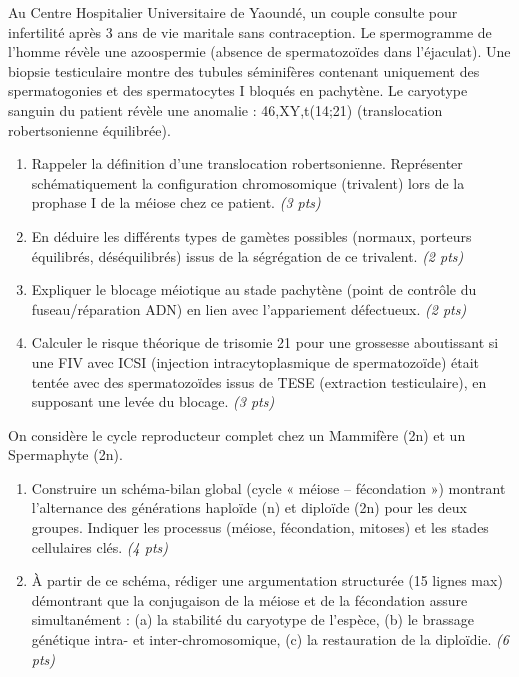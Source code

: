 \documentclass[11pt]{article}
\begin{document}
\begin{exercice}
Au Centre Hospitalier Universitaire de Yaoundé, un couple consulte pour infertilité après 3 ans de vie maritale sans contraception. Le spermogramme de l'homme révèle une azoospermie (absence de spermatozoïdes dans l'éjaculat). Une biopsie testiculaire montre des tubules séminifères contenant uniquement des spermatogonies et des spermatocytes I bloqués en pachytène. Le caryotype sanguin du patient révèle une anomalie : 46,XY,t(14;21) (translocation robertsonienne équilibrée).
\begin{enumerate}
    \item Rappeler la définition d'une translocation robertsonienne. Représenter schématiquement la configuration chromosomique (trivalent) lors de la prophase I de la méiose chez ce patient. \textit{(3 pts)}
    \item En déduire les différents types de gamètes possibles (normaux, porteurs équilibrés, déséquilibrés) issus de la ségrégation de ce trivalent. \textit{(2 pts)}
    \item Expliquer le blocage méiotique au stade pachytène (point de contrôle du fuseau/réparation ADN) en lien avec l'appariement défectueux. \textit{(2 pts)}
    \item Calculer le risque théorique de trisomie 21 pour une grossesse aboutissant si une FIV avec ICSI (injection intracytoplasmique de spermatozoïde) était tentée avec des spermatozoïdes issus de TESE (extraction testiculaire), en supposant une levée du blocage. \textit{(3 pts)}
\end{enumerate}
\end{exercice}

\begin{exercice}
On considère le cycle reproducteur complet chez un Mammifère (2n) et un Spermaphyte (2n).
\begin{enumerate}
    \item Construire un schéma-bilan global (cycle « méiose -- fécondation ») montrant l'alternance des générations haploïde (n) et diploïde (2n) pour les deux groupes. Indiquer les processus (méiose, fécondation, mitoses) et les stades cellulaires clés. \textit{(4 pts)}
    \item À partir de ce schéma, rédiger une argumentation structurée (15 lignes max) démontrant que la conjugaison de la méiose et de la fécondation assure simultanément : (a) la stabilité du caryotype de l'espèce, (b) le brassage génétique intra- et inter-chromosomique, (c) la restauration de la diploïdie. \textit{(6 pts)}
\end{enumerate}
\end{exercice}
\end{document}
